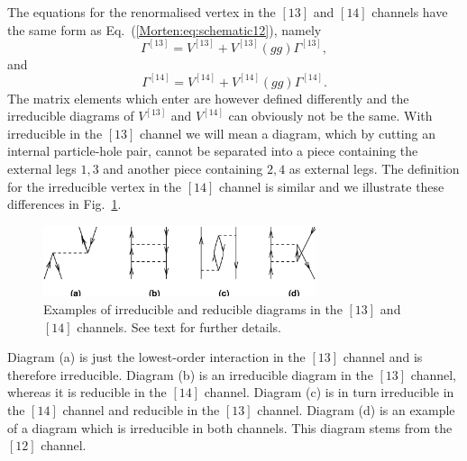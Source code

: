 The equations for the renormalised vertex in the $[13]$ and $[14]$
channels have the same form as Eq.~(\ref{Morten:eq:schematic12}), namely
\begin{equation}
     \Gamma^{[13]}=V^{[13]}+V^{[13]}(gg)\Gamma^{[13]},
\end{equation}
and 
\begin{equation}
     \Gamma^{[14]}=V^{[14]}+V^{[14]}(gg)\Gamma^{[14]}.
\end{equation}
The matrix elements which enter are however defined differently and
the irreducible diagrams of $V^{[13]}$ and $V^{[14]}$ can obviously
not be the same.  With irreducible in the $[13]$ channel we will mean
a diagram, which by cutting an internal particle-hole pair, cannot be
separated into a piece containing the external legs $1,3$ and another
piece containing $2,4$ as external legs. The definition for the
irreducible vertex in the $[14]$ channel is similar and we illustrate
these differences in Fig.~\ref{Morten:fig:1314channel}.
\begin{figure}%
	\begin{center}
      	\includegraphics[width=8cm]{diagramsph.eps}
	\end{center}
      \caption{Examples of irreducible and reducible diagrams in the 
               $[13]$ and $[14]$ channels. See text for further details.}
      \label{Morten:fig:1314channel}
\end{figure}
Diagram (a) is just the lowest-order
interaction in the $[13]$ channel and is therefore irreducible.
Diagram (b) is an irreducible diagram in the $[13]$ channel,
whereas it is reducible in the $[14]$ channel. Diagram (c) is in turn
irreducible in the $[14]$ channel and reducible in the $[13]$ channel. 
Diagram (d) is an example of a diagram which is irreducible in both
channels. This diagram stems from the $[12]$ channel.

